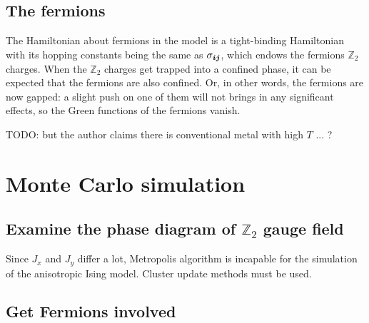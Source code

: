 \documentclass[hyperref, a4paper]{article}
\begin{document}
\subsection{The fermions}

The Hamiltonian about fermions in the model is a tight-binding Hamiltonian with its hopping constants being the same as $\sigma_{\vb*{i} \vb*{j}}$, which endows the fermions $\mathbb{Z}_2$ charges.
When the $\mathbb{Z}_2$ charges get trapped into a confined phase, it can be expected that the fermions are also confined.
Or, in other words, the fermions are now gapped: a slight push on one of them will not brings in any significant effects, so the Green functions of the fermions vanish.

TODO: but the author claims there is conventional metal with high $T$ ... ?

\section{Monte Carlo simulation}

\subsection{Examine the phase diagram of $\mathbb{Z}_2$ gauge field}

Since $J_x$ and $J_y$ differ a lot, Metropolis algorithm is incapable for the simulation of the anisotropic Ising model.
Cluster update methods must be used.

\subsection{Get Fermions involved}


 
\end{document}
